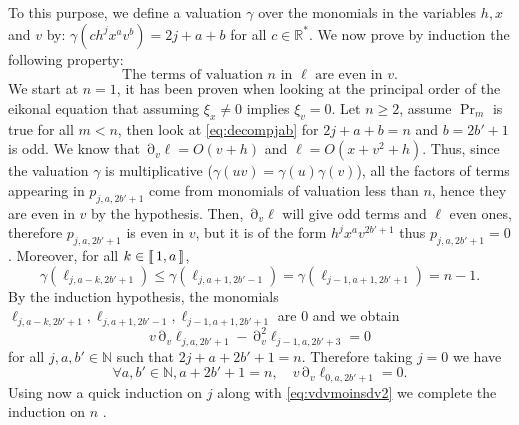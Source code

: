 \documentclass[12pt]{amsart}
\newcommand{\N}{\mathbb N}
\newcommand{\R}{\mathbb R}
\numberwithin{equation}{section}
\numberwithin{figure}{section}
\DeclareMathOperator{\p}{\partial}
\newcommand{\lb}{\operatorname{[\negthinspace [}}
\newcommand{\rb}{\operatorname{]\negthinspace ]}}
\begin{document}
To this purpose, we define a valuation $\gamma$ over the monomials in the variables $h,x$ and $v$ by: $\gamma(ch^jx^av^b) = 2j+a+b$ for all $c\in\R^*$. We now prove by induction the %
following property:
\begin{equation*}\label{HR}\tag{$\Pr_n$}
\text{The terms of valuation }n\text{ in }\ell\text{ are even in }v.
\end{equation*}
We %
start at $n=1$, it has been proven when looking at the principal order of the eikonal equation that assuming $\xi_x \neq 0$ implies $\xi_v = 0$. Let $n\geq2$, assume $\Pr_m$ is true for all $m<n$, then look at \eqref{eq:decompjab} for $2j+a+b = n$ and $b=2b'+1$ is odd. We know that $\p_v\ell = O(v+h)$ and $\ell = O(x + v^2 + h)$. Thus, since the valuation $\gamma$ is multiplicative ($\gamma(uv) = \gamma(u)\gamma(v)$), all the factors of terms appearing in $p_{j,a,2b'+1}$ come from monomials of valuation less than $n$, hence they are even in $v$ by the hypothesis. Then, $\p_v\ell$ will give odd terms and $\ell$ even ones, therefore $p_{j,a,2b'+1}$ is even in $v$, but it is of the form $h^jx^av^{2b'+1}$ thus $p_{j,a,2b'+1} = 0$. Moreover, for all $k\in\lb1,a\rb$,
\begin{equation*}
\gamma(\ell_{j,a-k,2b'+1}) \leq \gamma(\ell_{j,a+1,2b'-1}) = \gamma(\ell_{j-1,a+1,2b'+1}) = n-1.
\end{equation*}
By the induction hypothesis, the monomials $\ell_{j,a-k,2b'+1}, \ell_{j,a+1,2b'-1}, \ell_{j-1,a+1,2b'+1}$ are $0$ and we obtain
\begin{equation}\label{eq:vdvmoinsdv2}
v\p_v\ell_{j,a,2b'+1} - \p_v^2\ell_{j-1,a,2b'+3} = 0
\end{equation}
for all $j,a,b'\in\N$ such that $2j+a+2b'+1 = n$. Therefore %
taking $j=0$ we %
have
\begin{equation*}
\forall a,b'\in\N,a+2b'+1=n,\quad v\p_v\ell_{0,a,2b'+1} = 0.
\end{equation*}
Using now a quick induction on $j$ along %
with \eqref{eq:vdvmoinsdv2} we %
complete the induction on $n$%
.
\end{document}
